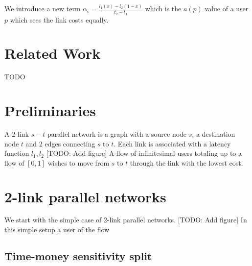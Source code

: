 \documentclass[a4paper,11pt]{article}
\newcommand{\as}{\mathrm{\alpha_s}}
\begin{document}
We introduce a new term $\as=\frac{l_1(x)-l_2(1-x)}{t_2-t_1}$ which is the $a(p)$ value of a user $p$ which sees the link costs equally.


\section{Related Work}
TODO


\section{Preliminaries}

A 2-link $s-t$ parallel network is a graph with a source node $s$, a destination node $t$ and $2$ edges connecting $s$ to $t$.
Each link is associated with a latency function $l_1, l_2$
[TODO: Add figure]
A flow of infinitesimal users totaling up to a flow of $[0, 1]$ wishes to move from $s$ to $t$ through the link with the lowest cost.


\section{2-link parallel networks}

We start with the simple case of 2-link parallel networks.
[TODO: Add figure]
In this simple setup a user of the flow 

\subsection{Time-money sensitivity split}
\end{document}
